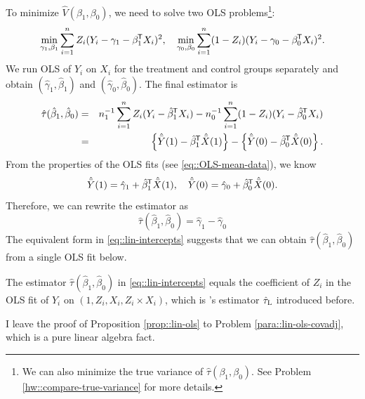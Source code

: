 To minimize $\hat{V}( \beta_1, \beta_0 )$, we need to solve two OLS problems\footnote{
We can also minimize the true variance of $\hat{\tau}(\beta_1, \beta_0) $. 
See Problem \ref{hw::compare-true-variance} for more details. 
}:
$$
\min_{\gamma_1 , \beta_1 }
\sum_{i=1}^n Z_i  ( Y_i - \gamma_1 - \beta_1^{\mkern-1.5mu\mathsf{T}}  X_i )^2,\quad
\min_{\gamma_0 , \beta_0 }
\sum_{i=1}^n (1-Z_i)  ( Y_i - \gamma_0 - \beta_0^{\mkern-1.5mu\mathsf{T}}  X_i  )^2.
$$
We run OLS of $Y_i$ on $X_i$ for the treatment and control groups separately and obtain $( \hat{\gamma}_1, \hat{\beta}_1 )$ and $( \hat{\gamma}_0, \hat{\beta}_0 )$. The final estimator is
\begin{eqnarray*}
 \hat{\tau}( \hat{\beta}_1, \hat{\beta}_0) &=& n_1^{-1} \sum_{i=1}^n Z_i(Y_i - \hat{\beta}_1^{\mkern-1.5mu\mathsf{T}}  X_i) 
- n_0^{-1} \sum_{i=1}^n (1-Z_i)  (Y_i - \hat{\beta}_0^{\mkern-1.5mu\mathsf{T}}  X_i) \\
&=&\left\{  \hat{\bar{Y}}(1) - \hat \beta_1^{\mkern-1.5mu\mathsf{T}} \hat{\bar{X} }(1) \right\}  
-  \left\{   \hat{\bar{Y}}(0) - \hat \beta_0^{\mkern-1.5mu\mathsf{T}} \hat{\bar{X} }(0) \right\} . 
\end{eqnarray*}
From the properties of the OLS fits (see \eqref{eq::OLS-mean-data}), we know
$$
\hat{\bar{Y}}(1) =  \hat{\gamma}_1 + \hat{\beta}_1^{\mkern-1.5mu\mathsf{T}}  \hat{\bar{X} }(1),\quad
\hat{\bar{Y}}(0) =  \hat{\gamma}_0 + \hat{\beta}_0^{\mkern-1.5mu\mathsf{T}}  \hat{\bar{X} }(0).
$$
Therefore, we can rewrite the estimator as
\begin{equation}
\label{eq::lin-intercepts}
 \hat{\tau}( \hat{\beta}_1, \hat{\beta}_0)  =  \hat{\gamma}_1 - \hat{\gamma}_0  
\end{equation}
The equivalent form in \eqref{eq::lin-intercepts} suggests that we can obtain $ \hat{\tau}( \hat{\beta}_1, \hat{\beta}_0) $ from a single OLS fit below.




\begin{proposition}\label{prop::lin-ols}
The estimator $ \hat{\tau}( \hat{\beta}_1, \hat{\beta}_0) $ in \eqref{eq::lin-intercepts} equals the coefficient of $Z_i$ in the OLS fit of $Y_i$ on $(1, Z_i, X_i, Z_i\times X_i)$, which is \citet{lin2013}'s estimator $\hat{\tau}_\textsc{L}$ introduced before. 
\end{proposition}

I leave the proof of Proposition \ref{prop::lin-ols} to Problem \ref{para::lin-ols-covadj}, which is a pure linear algebra fact. 


